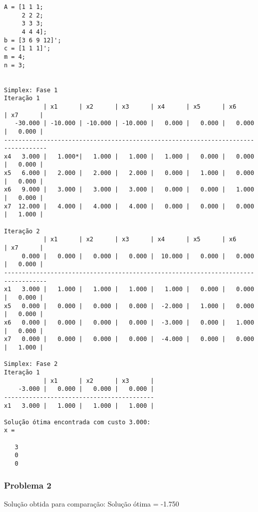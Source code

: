 \documentclass[brazil,times]{abnt}
\begin{document}
{\scriptsize \begin{verbatim}
A = [1 1 1;
	 2 2 2;
	 3 3 3;
	 4 4 4];
b = [3 6 9 12]';
c = [1 1 1]';
m = 4;
n = 3;


Simplex: Fase 1
Iteração 1
           | x1      | x2      | x3      | x4      | x5      | x6      | x7      |
   -30.000 | -10.000 | -10.000 | -10.000 |   0.000 |   0.000 |   0.000 |   0.000 |
----------------------------------------------------------------------------------
x4   3.000 |   1.000*|   1.000 |   1.000 |   1.000 |   0.000 |   0.000 |   0.000 |
x5   6.000 |   2.000 |   2.000 |   2.000 |   0.000 |   1.000 |   0.000 |   0.000 |
x6   9.000 |   3.000 |   3.000 |   3.000 |   0.000 |   0.000 |   1.000 |   0.000 |
x7  12.000 |   4.000 |   4.000 |   4.000 |   0.000 |   0.000 |   0.000 |   1.000 |

Iteração 2
           | x1      | x2      | x3      | x4      | x5      | x6      | x7      |
     0.000 |   0.000 |   0.000 |   0.000 |  10.000 |   0.000 |   0.000 |   0.000 |
----------------------------------------------------------------------------------
x1   3.000 |   1.000 |   1.000 |   1.000 |   1.000 |   0.000 |   0.000 |   0.000 |
x5   0.000 |   0.000 |   0.000 |   0.000 |  -2.000 |   1.000 |   0.000 |   0.000 |
x6   0.000 |   0.000 |   0.000 |   0.000 |  -3.000 |   0.000 |   1.000 |   0.000 |
x7   0.000 |   0.000 |   0.000 |   0.000 |  -4.000 |   0.000 |   0.000 |   1.000 |

Simplex: Fase 2
Iteração 1
           | x1      | x2      | x3      |
    -3.000 |   0.000 |   0.000 |   0.000 |
------------------------------------------
x1   3.000 |   1.000 |   1.000 |   1.000 |

Solução ótima encontrada com custo 3.000:
x =

   3
   0
   0
\end{verbatim} }


\subsubsection*{Problema 2}
Solução obtida para comparação: Solução ótima = -1.750
\end{document}
